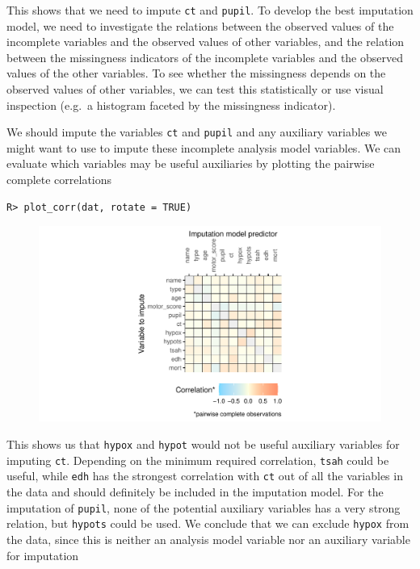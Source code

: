 \documentclass[
  article]{jss}
\begin{document}
This shows that we need to impute \texttt{ct} and \texttt{pupil}. To
develop the best imputation model, we need to investigate the relations
between the observed values of the incomplete variables and the observed
values of other variables, and the relation between the missingness
indicators of the incomplete variables and the observed values of the
other variables. To see whether the missingness depends on the observed
values of other variables, we can test this statistically or use visual
inspection (e.g.~a histogram faceted by the missingness indicator).

We should impute the variables \texttt{ct} and \texttt{pupil} and any
auxiliary variables we might want to use to impute these incomplete
analysis model variables. We can evaluate which variables may be useful
auxiliaries by plotting the pairwise complete correlations

\begin{verbatim}
R> plot_corr(dat, rotate = TRUE)
\end{verbatim}

\begin{figure}[h]

{\centering \includegraphics{manuscript_files/figure-pdf/unnamed-chunk-29-1.pdf}

}

\end{figure}

This shows us that \texttt{hypox} and \texttt{hypot} would not be useful
auxiliary variables for imputing \texttt{ct}. Depending on the minimum
required correlation, \texttt{tsah} could be useful, while \texttt{edh}
has the strongest correlation with \texttt{ct} out of all the variables
in the data and should definitely be included in the imputation model.
For the imputation of \texttt{pupil}, none of the potential auxiliary
variables has a very strong relation, but \texttt{hypots} could be used.
We conclude that we can exclude \texttt{hypox} from the data, since this
is neither an analysis model variable nor an auxiliary variable for
imputation
\end{document}
